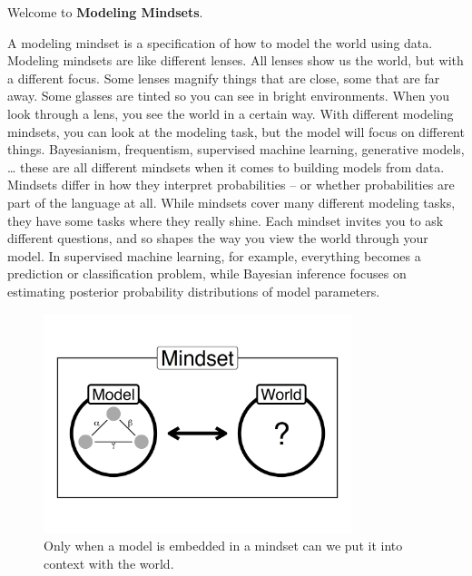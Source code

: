 \documentclass[
  10pt,
]{scrbook}
\begin{document}
Welcome to \textbf{Modeling Mindsets}.

A modeling mindset is a specification of how to model the world using data.
Modeling mindsets are like different lenses.
All lenses show us the world, but with a different focus.
Some lenses magnify things that are close, some that are far away.
Some glasses are tinted so you can see in bright environments.
When you look through a lens, you see the world in a certain way.
With different modeling mindsets, you can look at the modeling task, but the model will focus on different things.
Bayesianism, frequentism, supervised machine learning, generative models, \ldots{} these are all different mindsets when it comes to building models from data.
Mindsets differ in how they interpret probabilities -- or whether probabilities are part of the language at all.
While mindsets cover many different modeling tasks, they have some tasks where they really shine.
Each mindset invites you to ask different questions, and so shapes the way you view the world through your model.
In supervised machine learning, for example, everything becomes a prediction or classification problem, while Bayesian inference focuses on estimating posterior probability distributions of model parameters.

\begin{figure}

{\centering \includegraphics[width=0.8\textwidth]{figures/mindset-1} 

}

\caption{Only when a model is embedded in a mindset can we put it into context with the world.}\label{fig:mindset}
\end{figure}
\end{document}
